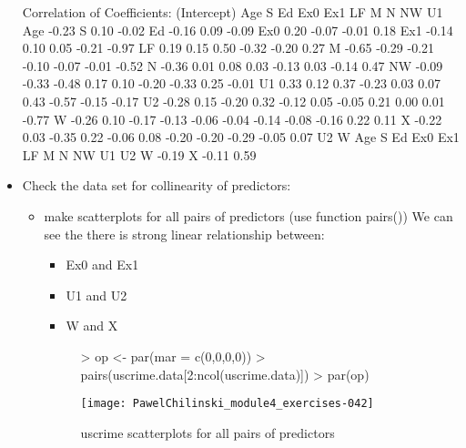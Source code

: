 \documentclass[a4paper]{article}
\begin{document}
\begin{itemize}
\begin{Schunk}
\begin{Soutput}
Correlation of Coefficients:
    (Intercept) Age   S     Ed    Ex0   Ex1   LF    M     N     NW    U1   
Age -0.23                                                                  
S    0.10       -0.02                                                      
Ed  -0.16        0.09 -0.09                                                
Ex0  0.20       -0.07 -0.01  0.18                                          
Ex1 -0.14        0.10  0.05 -0.21 -0.97                                    
LF   0.19        0.15  0.50 -0.32 -0.20  0.27                              
M   -0.65       -0.29 -0.21 -0.10 -0.07 -0.01 -0.52                        
N   -0.36        0.01  0.08  0.03 -0.13  0.03 -0.14  0.47                  
NW  -0.09       -0.33 -0.48  0.17  0.10 -0.20 -0.33  0.25 -0.01            
U1   0.33        0.12  0.37 -0.23  0.03  0.07  0.43 -0.57 -0.15 -0.17      
U2  -0.28        0.15 -0.20  0.32 -0.12  0.05 -0.05  0.21  0.00  0.01 -0.77
W   -0.26        0.10 -0.17 -0.13 -0.06 -0.04 -0.14 -0.08 -0.16  0.22  0.11
X   -0.22        0.03 -0.35  0.22 -0.06  0.08 -0.20 -0.20 -0.29 -0.05  0.07
    U2    W    
Age            
S              
Ed             
Ex0            
Ex1            
LF             
M              
N              
NW             
U1             
U2             
W   -0.19      
X   -0.11  0.59
\end{Soutput}
\end{Schunk}
\item Check the data set for collinearity of predictors:
\begin{itemize}
\item make scatterplots for all pairs of predictors (use function pairs())
We can see the there is strong linear relationship between:
\begin{itemize}
\item Ex0 and Ex1
\item U1 and U2
\item W and X
\end{itemize}
\begin{figure}[H]
\begin{center}
\begin{Schunk}
\begin{Sinput}
> op <- par(mar = c(0,0,0,0))
> pairs(uscrime.data[2:ncol(uscrime.data)])
> par(op)
\end{Sinput}
\end{Schunk}
\texttt{[image: PawelChilinski\_module4\_exercises-042]}
\caption{uscrime scatterplots for all pairs of predictors}
\end{center}

\end{figure}
\end{itemize}
\end{itemize}
\end{document}
